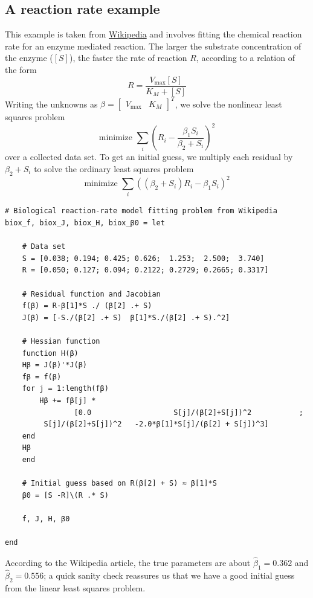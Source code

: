 \documentclass[12pt, leqno]{article} %
\begin{document}
\subsection{A reaction rate example}

This example is taken from
\href{https://en.wikipedia.org/wiki/Gauss\%E2\%80\%93Newton_algorithm\#Example}{Wikipedia}
and involves fitting the chemical reaction rate for an enzyme mediated
reaction. The larger the substrate concentration of the enzyme
(\([S]\)), the faster the rate of reaction \(R\), according to a
relation of the form \[R = \frac{V_{\max} [S]}{K_M + [S]}\] Writing the
unknowns as \(\beta = \begin{bmatrix} V_{\max} & K_M \end{bmatrix}^T\),
we solve the nonlinear least squares problem \[\mbox{minimize } 
  \sum_i \left( R_i - \frac{\beta_1 S_i}{\beta_2 + S_i} \right)^2\] over
a collected data set. To get an initial guess, we multiply each residual
by \(\beta_2 + S_i\) to solve the ordinary least squares problem
\[\mbox{minimize } \sum_i \left( (\beta_2 + S_i) R_i - \beta_1 S_i \right)^2\]

\begin{verbatim}
# Biological reaction-rate model fitting problem from Wikipedia
biox_f, biox_J, biox_H, biox_β0 = let

    # Data set
    S = [0.038; 0.194; 0.425; 0.626;  1.253;  2.500;  3.740]
    R = [0.050; 0.127; 0.094; 0.2122; 0.2729; 0.2665; 0.3317]
    
    # Residual function and Jacobian
    f(β) = R-β[1]*S ./ (β[2] .+ S)
    J(β) = [-S./(β[2] .+ S)  β[1]*S./(β[2] .+ S).^2]
    
    # Hessian function
    function H(β)
	Hβ = J(β)'*J(β)
	fβ = f(β)
	for j = 1:length(fβ)
	    Hβ += fβ[j] *
                [0.0                   S[j]/(β[2]+S[j])^2           ;
		 S[j]/(β[2]+S[j])^2   -2.0*β[1]*S[j]/(β[2] + S[j])^3]
	end
	Hβ
    end
    
    # Initial guess based on R(β[2] + S) ≈ β[1]*S
    β0 = [S -R]\(R .* S)
    
    f, J, H, β0
    
end
\end{verbatim}

According to the Wikipedia article, the true parameters are about
\(\hat{\beta}_1 = 0.362\) and \(\hat{\beta}_2 = 0.556\); a quick sanity
check reassures us that we have a good initial guess from the linear
least squares problem.
\end{document}
